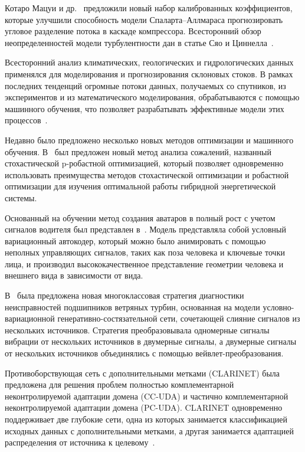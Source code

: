 \documentclass[mathematics,article,accept,pdftex,moreauthors]{Definitions/mdpi}
\begin{document}
Котаро Мацуи и др.~\cite{Matsui2021} предложили новый набор калиброванных коэффициентов, которые улучшили способность модели Спаларта--Аллмараса прогнозировать угловое разделение потока в каскаде компрессора. Всесторонний обзор неопределенностей модели турбулентности дан в статье Сяо и Циннелла~\cite{Xiao2019}.

Всесторонний анализ климатических, геологических и гидрологических данных применялся для моделирования и прогнозирования склоновых стоков. В рамках последних тенденций огромные потоки данных, получаемых со спутников, из экспериментов и из математического моделирования, обрабатываются с помощью машинного обучения, что позволяет разрабатывать эффективные модели этих процессов~\cite{GeoML, Ma2020}.


Недавно было предложено несколько новых методов оптимизации и машинного обучения.
В~\cite{YuWuWang2022} был предложен новый метод анализа сожалений, названный стохастической p-робастной оптимизацией, который позволяет одновременно использовать преимущества методов стохастической оптимизации и робастной оптимизации для изучения оптимальной работы гибридной энергетической системы.

Основанный на обучении метод создания аватаров в полный рост с учетом сигналов водителя был представлен в~\cite{BagautdnovWuSimon2021}. Модель представляла собой условный вариационный автокодер, который можно было анимировать с помощью неполных управляющих сигналов, таких как поза человека и ключевые точки лица, и производил высококачественное представление геометрии человека и внешнего вида в зависимости от вида.

В~\cite{ZhangZhangCai2022} была предложена новая многоклассовая стратегия диагностики неисправностей подшипников ветряных турбин, основанная на модели условно-вариационной генеративно-состязательной сети, сочетающей слияние сигналов из нескольких источников. Стратегия преобразовывала одномерные сигналы вибрации от нескольких источников в двумерные сигналы, а двумерные сигналы от нескольких источников объединялись с помощью вейвлет-преобразования.

Противоборствующая сеть с дополнительными метками (CLARINET) была предложена для решения проблем полностью комплементарной неконтролируемой адаптации домена (CC-UDA) и частично комплементарной неконтролируемой адаптации домена (PC-UDA). CLARINET одновременно поддерживает две глубокие сети, одна из которых занимается классификацией исходных данных с дополнительными метками, а другая занимается адаптацией распределения от источника к целевому~\cite{ZhangLiuFang2021}.
\end{document}
